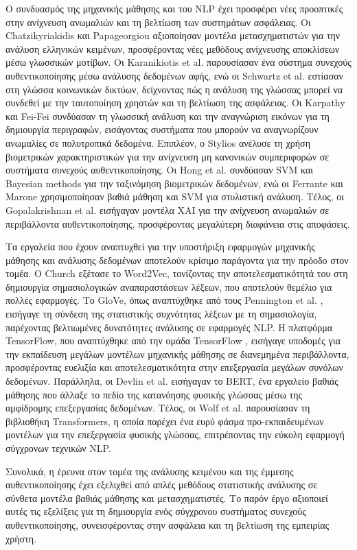 Ο συνδυασμός της μηχανικής μάθησης και του NLP έχει προσφέρει νέες προοπτικές στην ανίχνευση ανωμαλιών και τη βελτίωση των συστημάτων ασφάλειας. Οι Chatzikyriakidis και Papageorgiou \cite{chatzikyriakidis2021transformer} αξιοποίησαν μοντέλα μετασχηματιστών για την ανάλυση ελληνικών κειμένων, προσφέροντας νέες μεθόδους ανίχνευσης αποκλίσεων μέσω γλωσσικών μοτίβων. Οι Karanikiotis et al. \cite{karanikiotis2020continuous} παρουσίασαν ένα σύστημα συνεχούς αυθεντικοποίησης μέσω ανάλυσης δεδομένων αφής, ενώ οι Schwartz et al. \cite{schwartz2013authorship} εστίασαν στη γλώσσα κοινωνικών δικτύων, δείχνοντας πώς η ανάλυση της γλώσσας μπορεί να συνδεθεί με την ταυτοποίηση χρηστών και τη βελτίωση της ασφάλειας. Οι Karpathy και Fei-Fei \cite{karpathy2018deep} συνδύασαν τη γλωσσική ανάλυση και την αναγνώριση εικόνων για τη δημιουργία περιγραφών, εισάγοντας συστήματα που μπορούν να αναγνωρίζουν ανωμαλίες σε πολυτροπικά δεδομένα. Επιπλέον, ο Stylios \cite{stylios2023behavioral} ανέλυσε τη χρήση βιομετρικών χαρακτηριστικών για την ανίχνευση μη κανονικών συμπεριφορών σε συστήματα συνεχούς αυθεντικοποίησης. Οι Hong et al. \cite{hong2008fingerprint} συνδύασαν SVM και Bayesian methods για την ταξινόμηση βιομετρικών δεδομένων, ενώ οι Ferrante και Marone \cite{ferrante2022stylometric} χρησιμοποίησαν βαθιά μάθηση και SVM για στυλιστική ανάλυση. Τέλος, οι Gopalakrishnan et al. \cite{gopalakrishnan2021explainable} εισήγαγαν μοντέλα XAI για την ανίχνευση ανωμαλιών σε περιβάλλοντα αυθεντικοποίησης, προσφέροντας μεγαλύτερη διαφάνεια στις αποφάσεις.

Τα εργαλεία που έχουν αναπτυχθεί για την υποστήριξη εφαρμογών μηχανικής μάθησης και ανάλυσης δεδομένων αποτελούν κρίσιμο παράγοντα για την πρόοδο στον τομέα. Ο Church \cite{church2017word2vec} εξέτασε το Word2Vec, τονίζοντας την αποτελεσματικότητά του στη δημιουργία σημασιολογικών αναπαραστάσεων λέξεων, που αποτελούν θεμέλιο για πολλές εφαρμογές. Το GloVe, όπως αναπτύχθηκε από τους Pennington et al. \cite{pennington2014glove}, εισήγαγε τη σύνδεση της στατιστικής συχνότητας λέξεων με τη σημασιολογία, παρέχοντας βελτιωμένες δυνατότητες ανάλυσης σε εφαρμογές NLP. Η πλατφόρμα TensorFlow, που αναπτύχθηκε από την ομάδα TensorFlow \cite{tensorflow2015-large-scale}, εισήγαγε υποδομές για την εκπαίδευση μεγάλων μοντέλων μηχανικής μάθησης σε διανεμημένα περιβάλλοντα, προσφέροντας ευελιξία και αποτελεσματικότητα στην επεξεργασία μεγάλων συνόλων δεδομένων. Παράλληλα, οι Devlin et al. \cite{devlin2018bert} εισήγαγαν το BERT, ένα εργαλείο βαθιάς μάθησης που άλλαξε το πεδίο της κατανόησης φυσικής γλώσσας μέσω της αμφίδρομης επεξεργασίας δεδομένων. Τέλος, οι Wolf et al. \cite{wolf2020transformers} παρουσίασαν τη βιβλιοθήκη Transformers, η οποία παρέχει ένα ευρύ φάσμα προ-εκπαιδευμένων μοντέλων για την επεξεργασία φυσικής γλώσσας, επιτρέποντας την εύκολη εφαρμογή σύγχρονων τεχνικών NLP.  

Συνολικά, η έρευνα στον τομέα της ανάλυσης κειμένου και της έμμεσης αυθεντικοποίησης έχει εξελιχθεί από απλές μεθόδους στατιστικής ανάλυσης σε σύνθετα μοντέλα βαθιάς μάθησης και μετασχηματιστές. Το παρόν έργο αξιοποιεί αυτές τις εξελίξεις για τη δημιουργία ενός σύγχρονου συστήματος συνεχούς αυθεντικοποίησης, συνεισφέροντας στην ασφάλεια και τη βελτίωση της εμπειρίας χρήστη.

